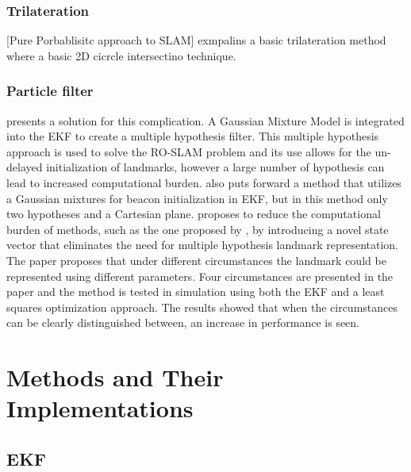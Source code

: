 \documentclass[conference]{IEEEtran}
\begin{document}
	\subsubsection{Trilateration}
	[Pure Porbablisitc approach to SLAM] exmpalins a basic trilateration method where a basic 2D cicrcle intersectino technique. %
	\subsubsection{Particle filter}
	
	
	
	\cite{Caballero2010} presents a solution for this complication. A Gaussian Mixture Model is integrated into the EKF to create a multiple hypothesis filter.  This multiple hypothesis approach is used to solve the RO-SLAM problem and its use allows for the un-delayed initialization of landmarks, however a large number of hypothesis can lead to increased computational burden. \cite{Geneve2015} also puts forward a method that utilizes a Gaussian mixtures for beacon initialization in EKF, but in this method only two hypotheses and a Cartesian plane. \cite{Ahmad2011a} proposes to reduce the computational burden of methods, such as the one proposed by \cite{Caballero2010}, by introducing a novel state vector that eliminates the need for multiple hypothesis landmark representation. The paper proposes that under different circumstances the landmark could be represented using different parameters. Four circumstances are presented in the paper and the method is tested in simulation using both the EKF and a least squares optimization approach. The results showed that when the circumstances can be clearly distinguished between, an increase in performance is seen.
	
	
	

	\section{Methods and Their Implementations}
	
	\subsection{EKF}
	
	
	
\end{document}
